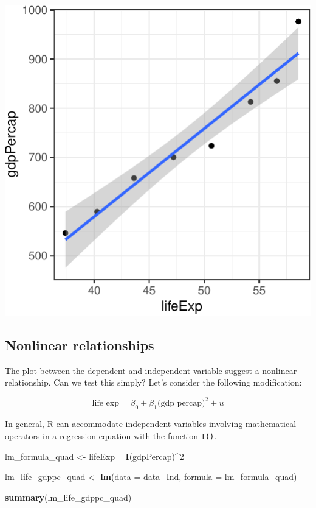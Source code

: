 \documentclass[12pt,]{article}
\newenvironment{Shaded}{\begin{snugshade}}{\end{snugshade}}
\newcommand{\KeywordTok}[1]{\textcolor[rgb]{0.13,0.29,0.53}{\textbf{#1}}}
\newcommand{\DataTypeTok}[1]{\textcolor[rgb]{0.13,0.29,0.53}{#1}}
\newcommand{\DecValTok}[1]{\textcolor[rgb]{0.00,0.00,0.81}{#1}}
\newcommand{\StringTok}[1]{\textcolor[rgb]{0.31,0.60,0.02}{#1}}
\newcommand{\OperatorTok}[1]{\textcolor[rgb]{0.81,0.36,0.00}{\textbf{#1}}}
\newcommand{\NormalTok}[1]{#1}
\begin{document}
\begin{center}\includegraphics{Intro_tips_tricks_files/figure-latex/data_Ind_lm_subset-1} \end{center}

\subsection{Nonlinear relationships}\label{nonlinear-relationships}

The plot between the dependent and independent variable suggest a
nonlinear relationship. Can we test this simply? Let's consider the
following modification:

\[
\text{life exp} = \beta_0 + \beta_1 \text{(gdp percap)}^2 + u
\]

In general, R can accommodate independent variables involving
mathematical operators in a regression equation with the function
\texttt{I()}.

\begin{Shaded}
\begin{Highlighting}[]
\NormalTok{lm_formula_quad <-}\StringTok{ }\NormalTok{lifeExp }\OperatorTok{~}\StringTok{ }\KeywordTok{I}\NormalTok{(gdpPercap)}\OperatorTok{^}\DecValTok{2}

\NormalTok{lm_life_gdppc_quad <-}\StringTok{ }\KeywordTok{lm}\NormalTok{(}\DataTypeTok{data =}\NormalTok{ data_Ind, }\DataTypeTok{formula =}\NormalTok{ lm_formula_quad)}

\KeywordTok{summary}\NormalTok{(lm_life_gdppc_quad)}
\end{Highlighting}
\end{Shaded}
\end{document}
